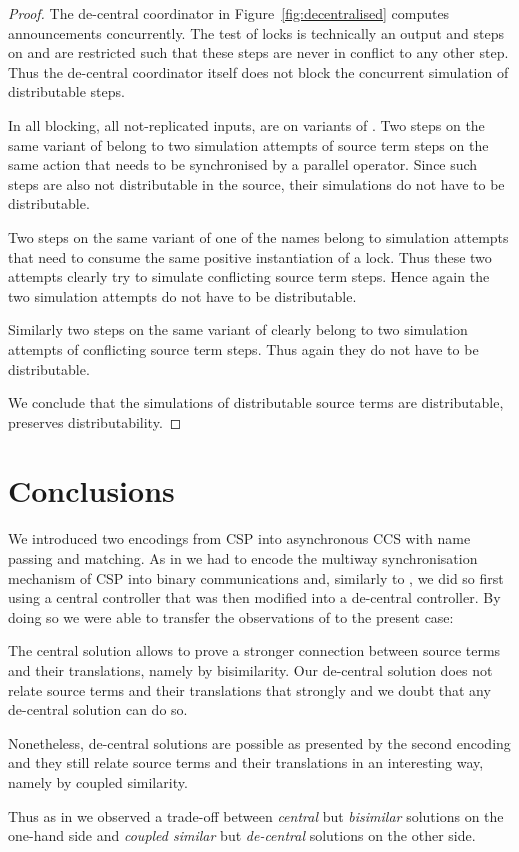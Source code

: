 \documentclass[]{eptcs}
\begin{document}
\begin{proof}
	The de-central coordinator in Figure~\ref{fig:decentralised} computes announcements concurrently. The test of locks is technically an output and steps on  and  are restricted such that these steps are never in conflict to any other step. Thus the de-central coordinator itself does not block the concurrent simulation of distributable steps.
	
	In  all blocking, \ie all not-replicated inputs, are on variants of . Two steps on the same variant of  belong to two simulation attempts of source term steps on the same action that needs to be synchronised by a parallel operator. Since such steps are also not distributable in the source, their simulations do not have to be distributable.
	
	Two steps on the same variant of one of the names  belong to simulation attempts that need to consume the same positive instantiation of a lock. Thus these two attempts clearly try to simulate conflicting source term steps. Hence again the two simulation attempts do not have to be distributable.
	
	Similarly two steps on the same variant of  clearly belong to two simulation attempts of conflicting source term steps. Thus again they do not have to be distributable.
	
	We conclude that the simulations of distributable source terms are distributable, \ie  preserves distributability.
\end{proof}


\section{Conclusions}
\label{sec:conclusion}

We introduced two encodings from CSP into asynchronous CCS with name passing and matching.
As in \cite{parrowCoupled92} we had to encode the multiway synchronisation mechanism of CSP into binary communications and, similarly to \cite{parrowCoupled92}, we did so first using a central controller that was then modified into a de-central controller.
By doing so we were able to transfer the observations of \cite{parrowCoupled92} to the present case:
\begin{compactenum}
	\item The central solution allows to prove a stronger connection between source terms and their translations, namely by bisimilarity. Our de-central solution does not relate source terms and their translations that strongly and we doubt that any de-central solution can do so.
	\item Nonetheless, de-central solutions are possible as presented by the second encoding and they still relate source terms and their translations in an interesting way, namely by coupled similarity.
\end{compactenum}
Thus as in \cite{parrowCoupled92} we observed a trade-off between \emph{central} but \emph{bisimilar} solutions on the one-hand side and \emph{coupled similar} but \emph{de-central} solutions on the other side.
\end{document}
